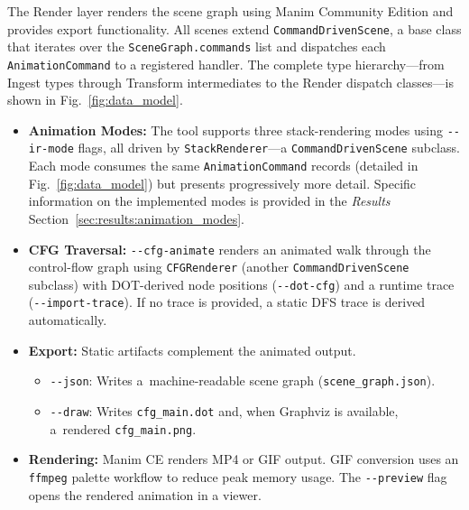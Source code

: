 The Render layer renders the scene graph using Manim Community Edition\cite{manimce} and provides export functionality. All scenes extend \texttt{Command\-Driven\-Scene}, a base class that iterates over the \texttt{Scene\-Graph.commands} list and dispatches each \texttt{Animation\-Command} to a registered handler. The complete type hierarchy---from Ingest types through Transform intermediates to the Render dispatch classes---is shown in Fig.~\ref{fig:data_model}.

\begin{itemize}
    \item \textbf{Animation Modes:} The tool supports three stack-rendering modes using \texttt{-{}-ir-mode} flags, all driven by \texttt{Stack\-Renderer}---a \texttt{Command\-Driven\-Scene} subclass. Each mode consumes the same \texttt{Animation\-Command} records (detailed in Fig.~\ref{fig:data_model}) but presents progressively more detail. Specific information on the implemented modes is provided in the \textit{Results} Section~\ref{sec:results:animation_modes}.

    \item \textbf{CFG Traversal:} \texttt{-{}-cfg-animate} renders an animated walk through the control-flow graph using \texttt{CFG\-Renderer} (another \texttt{Command\-Driven\-Scene} subclass) with DOT-derived node positions (\texttt{-{}-dot-cfg}) and a runtime trace (\texttt{-{}-import-trace}). If no trace is provided, a static DFS trace is derived automatically.

    \item \textbf{Export:} Static artifacts complement the animated output.
    \begin{itemize}
        \item \texttt{-{}-json}: Writes a~machine-readable scene graph (\texttt{scene\_graph.json}).
        \item \texttt{-{}-draw}: Writes \texttt{cfg\_main.dot} and, when Graphviz is available, a~rendered \texttt{cfg\_main.png}.
    \end{itemize}

    \item \textbf{Rendering:} Manim CE renders MP4 or GIF output. GIF conversion uses an \texttt{ffmpeg} palette workflow to reduce peak memory usage. The \texttt{-{}-preview} flag opens the rendered animation in a viewer.
\end{itemize}
